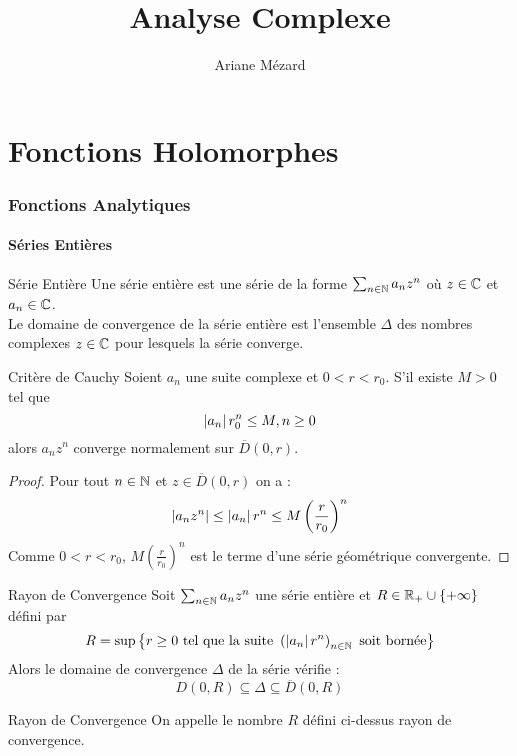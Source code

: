 \documentclass{cours}
\title{Analyse Complexe}
\author{Ariane Mézard}
\begin{document}
\part{Fonctions Holomorphes}
\section{Fonctions Analytiques}
\subsection{Séries Entières}
\begin{définition}{Série Entière}{}
    Une série entière est une série de la forme $\sum_{n \in \mathbb{N}}a_{n}z^{n}$ où $z \in \mathbb{C}$ et $a_{n} \in \mathbb{C}$.\\
    Le domaine de convergence de la série entière est l'ensemble $\Delta$ des nombres complexes $z \in \mathbb{C}$ pour lesquels la série converge.  
\end{définition}
\begin{propositionfr}{Critère de Cauchy}{}
    Soient $a_{n}$ une suite complexe et $0 < r < r_{0}$. S'il existe $M > 0$ tel que 
    \[
        \left|a_{n}\right|r_{0}^{n} \leq M, n \geq 0
    \]
    alors $a_{n}z^{n}$ converge normalement sur $\overline{D}(0, r)$.
\end{propositionfr}
\begin{proof}
    Pour tout $n \in \mathbb{N}$ et $z \in \overline{D}(0, r)$ on a : 
    \[
        \left|a_{n}z^{n}\right| \leq \left|a_{n}\right|r^{n} \leq M\left(\frac{r}{r_{0}}\right)^{n}
    \]
    Comme $0 < r < r_{0}$, $M \left(\frac{r}{r_{0}}\right)^{n}$ est le terme d'une série géométrique convergente.
\end{proof}

\begin{corollaire}{Rayon de Convergence}{}
    Soit $\sum_{n \in \mathbb{N}} a_{n}z^{n}$ une série entière et $R \in \mathbb{R}_{+} \cup \{+ \infty\}$ défini par 
    \[
        R = \sup \left\{r \geq 0 \text{ tel que la suite } \left(\left|a_{n}\right|r^{n}\right)_{n \in \mathbb{N}} \text{ soit bornée}\right\}
    \]
    Alors le domaine de convergence $\Delta$ de la série vérifie : 
    \[
        D(0, R) \subseteq \Delta \subseteq \overline{D}(0, R)
    \]
\end{corollaire}

\begin{définition}{Rayon de Convergence}{}
    On appelle le nombre $R$ défini ci-dessus rayon de convergence.
\end{définition}
\end{document}
